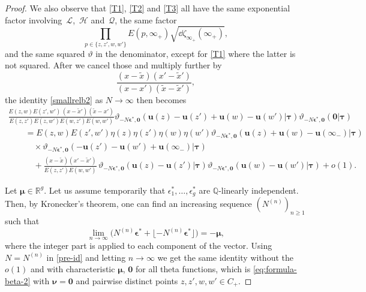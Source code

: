 \documentclass[pdftex]{sigma}
\numberwithin{equation}{section}
\begin{document}
\begin{proof}
We also observe that \eqref{T1}, \eqref{T2} and \eqref{T3} all have the same exponential factor involving~$\mathcal{L}$,~$\mathcal{H}$ and~$\mathcal{Q}$, the same factor
\[
\prod_{p \in \{z,z',w,w'\}} E(p,\infty_+)\sqrt{\dd \zeta_{\infty_+}(\infty_+)},
\]
and the same squared $\vartheta$ in the denominator, except for \eqref{T1} where the latter is not squared. After we cancel those and multiply further by
\[
\frac{(x - \tilde{x})(x' - \tilde{x}')}{(x - x')(\tilde{x} - \tilde{x}')},
\]
the identity \eqref{smallrelb2} as $N \rightarrow \infty$ then becomes
\begin{gather}
 \frac{E(z,w)E(z',w')\,(x - \tilde{x}')(\tilde{x} - x')}{E(z,z')E(z,w')E(w,z')E(w,w')}\vartheta_{-N\bm{\epsilon}^*,\bm{0}} (\bm{u}(z) - \bm{u}(z') + \bm{u}(w) - \bm{u}(w') |\bm{\tau} )\vartheta_{-N\bm{\epsilon}^*,\bm{0}} (\bm{0} |\bm{\tau} ) \nonumber\\
 \qquad{}= E(z,w)E(z',w')\eta(z)\eta(z')\eta(w)\eta(w')\vartheta_{-N\bm{\epsilon}^*,\bm{0}} (\bm{u}(z) + \bm{u}(w) - \bm{u}(\infty_-) |\bm{\tau} )\nonumber\\
  \qquad\quad{}\times\vartheta_{-N\bm{\epsilon}^*,\bm{0}} (- \bm{u}(z') - \bm{u}(w') + \bm{u}(\infty_-) |\bm{\tau} ) \nonumber\\
 \qquad\quad{}+ \frac{(x - \tilde{x})(x' - \tilde{x}')}{E(z,z')E(w,w')}\,\vartheta_{-N\bm{\epsilon}^*,\bm{0}} (\bm{u}(z) - \bm{u}(z') |\bm{\tau} )\vartheta_{-N\bm{\epsilon}^*,\bm{0}} (\bm{u}(w) - \bm{u}(w') |\bm{\tau} ) + o(1).\label{pre-id}
\end{gather}

Let $\bm{\mu} \in \mathbb{R}^g$. Let us assume temporarily that
$\epsilon_{1}^*, \ldots, \epsilon_{g}^*$ are $\mathbb{Q}$-linearly independent. Then,
by Kronecker's theorem, one can find an increasing sequence $(N^{(n)})_{n \geq 1}$
such that
\begin{equation*}
 \lim_{n \rightarrow \infty}\bigl(N^{(n)} \bm{\epsilon}^* + \lfloor -N^{(n)}\bm{\epsilon}^* \rfloor\bigr) = - \bm{\mu},
\end{equation*}
where the integer part is applied to each component of the vector.
Using $N = N^{(n)}$ in \eqref{pre-id} and letting $n \rightarrow \infty$
we get the same identity without the $o(1)$ and with characteristic
$\bm{\mu}$, $\bm{0}$ for all theta functions, which is \eqref{eq:formula-beta-2} with $\bm{\nu} = \bm{0}$ and pairwise distinct points $z,z',w,w' \in C_+$.




\end{proof}
\end{document}
